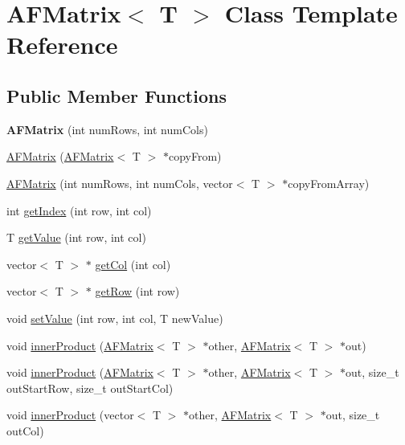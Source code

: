 \hypertarget{classAFMatrix}{}\section{A\+F\+Matrix$<$ T $>$ Class Template Reference}
\label{classAFMatrix}
\subsection*{Public Member Functions}
\begin{DoxyCompactItemize}
\item 
\mbox{\label{classAFMatrix_a58a311fa4463d74220defb49a6cc43f8}} 
{\bfseries A\+F\+Matrix} (int num\+Rows, int num\+Cols)
\item 
\hyperlink{classAFMatrix_a918b5f7c03cb3a305ec94e08afd3e09a}{A\+F\+Matrix} (\hyperlink{classAFMatrix}{A\+F\+Matrix}$<$ T $>$ $\ast$copy\+From)
\item 
\hyperlink{classAFMatrix_a0dfd54218d171d086a738a0525c5946e}{A\+F\+Matrix} (int num\+Rows, int num\+Cols, vector$<$ T $>$ $\ast$copy\+From\+Array)
\item 
int \hyperlink{classAFMatrix_a582a394221722603e21b6571e95d69a7}{get\+Index} (int row, int col)
\item 
T \hyperlink{classAFMatrix_a42f6c9d02b5507b39bf8899fea730cbf}{get\+Value} (int row, int col)
\item 
vector$<$ T $>$ $\ast$ \hyperlink{classAFMatrix_af5917b11c5f2f0ff76d9cb5f615123b5}{get\+Col} (int col)
\item 
vector$<$ T $>$ $\ast$ \hyperlink{classAFMatrix_a2474e9ce55e4a2773291304e3c48af1f}{get\+Row} (int row)
\item 
void \hyperlink{classAFMatrix_ac8a60442dd87009f6d7fe147bdce2b89}{set\+Value} (int row, int col, T new\+Value)
\item 
void \hyperlink{classAFMatrix_a2c4d9cfe683f893fd961904a788f952a}{inner\+Product} (\hyperlink{classAFMatrix}{A\+F\+Matrix}$<$ T $>$ $\ast$other, \hyperlink{classAFMatrix}{A\+F\+Matrix}$<$ T $>$ $\ast$out)
\item 
void \hyperlink{classAFMatrix_aef663e647574c6f759bee01f9c017a62}{inner\+Product} (\hyperlink{classAFMatrix}{A\+F\+Matrix}$<$ T $>$ $\ast$other, \hyperlink{classAFMatrix}{A\+F\+Matrix}$<$ T $>$ $\ast$out, size\+\_\+t out\+Start\+Row, size\+\_\+t out\+Start\+Col)
\item 
void \hyperlink{classAFMatrix_a8563ff2d66c9298a08100fbb11b0217b}{inner\+Product} (vector$<$ T $>$ $\ast$other, \hyperlink{classAFMatrix}{A\+F\+Matrix}$<$ T $>$ $\ast$out, size\+\_\+t out\+Col)

\end{DoxyCompactItemize}
